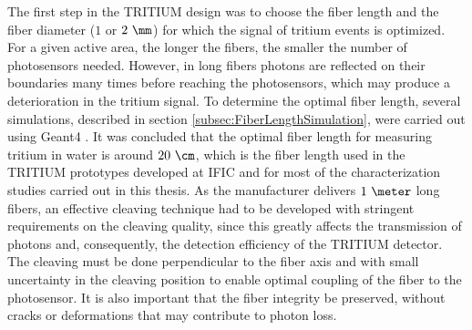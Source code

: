 The first step in the TRITIUM design was to choose the fiber length and the fiber diameter ($1$ or $2~\mm$) for which the signal of tritium events is optimized. For a given active area, the longer the fibers, the smaller the number of photosensors needed. However, in long fibers photons are reflected on their boundaries many times before reaching the photosensors, which may produce a deterioration in the tritium signal. To determine the optimal fiber length, several simulations, described in section \ref{subsec:FiberLengthSimulation}, were carried out using Geant4 \cite{Geant4WebPage}. It was concluded that the optimal fiber length for measuring tritium in water is around $20~\cm$, which is the fiber length used in the TRITIUM prototypes developed at IFIC and for most of the characterization studies carried out in this thesis. As the manufacturer \cite{SaintGobain} delivers $1~\meter$ long fibers, an effective cleaving technique had to be developed with stringent requirements on the cleaving quality, since this greatly affects the transmission of photons and, consequently, the detection efficiency of the TRITIUM detector. The cleaving must be done perpendicular to the fiber axis and with small uncertainty in the cleaving position to enable optimal coupling of the fiber to the photosensor. It is also important that the fiber integrity be preserved, without cracks or deformations that may contribute to photon loss. 

